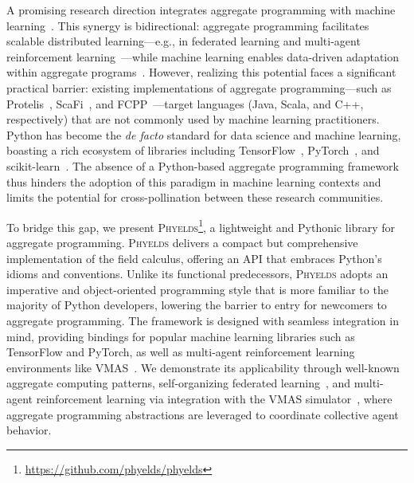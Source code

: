 \documentclass[runningheads]{llncs}
\begin{document}
A promising research direction integrates aggregate programming with machine learning~\cite{aguzzi2022machine}.
%
This synergy is bidirectional: 
 aggregate programming facilitates scalable distributed learning---e.g., in federated learning 
 and multi-agent reinforcement learning~\cite{DBLP:journals/iot/DominiFAVE26,aguzzi2023field,DBLP:journals/scp/DominiCAV24}---while machine learning enables data-driven adaptation within aggregate programs~\cite{aguzzi2022addressing}.
%
However, 
 realizing this potential faces a significant practical barrier: 
 existing implementations of aggregate programming---such as Protelis~\cite{DBLP:conf/sac/PianiniVB15}, 
 ScaFi~\cite{DBLP:journals/softx/CasadeiVAP22}, 
 and FCPP~\cite{DBLP:journals/scp/AudritoT24}---target languages (Java, Scala, and C++, respectively) 
 that are not commonly used by machine learning practitioners.
%
Python has become the \emph{de facto} standard for data science and machine learning, 
 boasting a rich ecosystem of libraries including TensorFlow~\cite{DBLP:conf/osdi/AbadiBCCDDDGIIK16}, 
 PyTorch~\cite{DBLP:conf/nips/PaszkeGMLBCKLGA19}, 
 and scikit-learn~\cite{DBLP:journals/jmlr/PedregosaVGMTGBPWDVPCBPD11}.
%
The absence of a Python-based aggregate programming framework thus hinders 
 the adoption of this paradigm in machine learning contexts 
 and limits the potential for cross-pollination between these research communities.

To bridge this gap, we present \textsc{Phyelds}\footnote{\url{https://github.com/phyelds/phyelds}}, 
 a lightweight and Pythonic library for aggregate programming.
%
\textsc{Phyelds} delivers a compact but comprehensive implementation of the field calculus, 
 offering an API that embraces Python's idioms and conventions.
%
Unlike its functional predecessors, 
 \textsc{Phyelds} adopts an imperative and object-oriented programming style 
 that is more familiar to the majority of Python developers, 
 lowering the barrier to entry for newcomers to aggregate programming.
%
The framework is designed with seamless integration in mind, 
 providing bindings for popular machine learning libraries 
 such as TensorFlow and PyTorch, 
 as well as multi-agent reinforcement learning environments like VMAS~\cite{bettini2022dars}.
%
We demonstrate its applicability through well-known aggregate computing patterns, 
 self-organizing federated learning~\cite{DBLP:journals/iot/DominiFAVE26,DBLP:journals/lmcs/DominiAEV26,DBLP:conf/ijcnn/DominiEACZLV25}, 
 and multi-agent reinforcement learning via integration with the VMAS simulator~\cite{bettini2022dars}, 
 where aggregate programming abstractions are leveraged to coordinate collective agent behavior.
 
\end{document}

